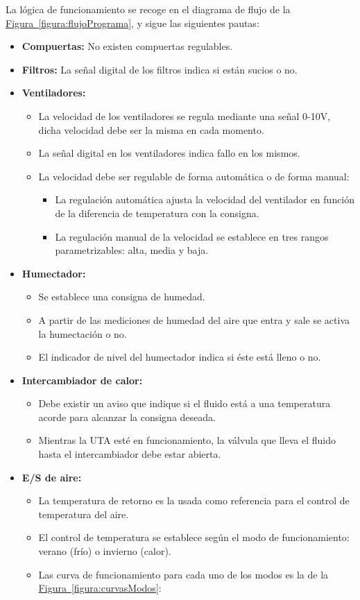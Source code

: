 La lógica de funcionamiento se recoge en el diagrama de flujo de la \hyperref[figura:flujoPrograma]{Figura~\ref{figura:flujoPrograma}}, y sigue las siguientes pautas:

\begin{itemize}
  \item \textbf{Compuertas:} No existen compuertas regulables.
  \item \textbf{Filtros:} La señal digital de los filtros indica si están sucios o no.
  \item \textbf{Ventiladores:} 
  \begin{itemize}
    \item La velocidad de los ventiladores se regula mediante una señal 0-10V, dicha velocidad debe ser la misma en cada momento.
    \item La señal digital en los ventiladores indica fallo en los mismos.
    \item La velocidad debe ser regulable de forma automática o de forma manual:
    \begin{itemize}
      \item La regulación automática ajusta la velocidad del ventilador en función de la diferencia de temperatura con la consigna.
      \item La regulación manual de la velocidad se establece en tres rangos parametrizables: alta, media y baja.
    \end{itemize}
  \end{itemize} 
  \item \textbf{Humectador:} 
  \begin{itemize}
    \item Se establece una consigna de humedad.
    \item A partir de las mediciones de humedad del aire que entra y sale se activa la humectación o no.
    \item El indicador de nivel del humectador indica si éste está lleno o no.
  \end{itemize}
  \item \textbf{Intercambiador de calor:}
  \begin{itemize}
    \item Debe existir un aviso que indique si el fluido está a una temperatura acorde para alcanzar la consigna deseada.
    \item Mientras la UTA esté en funcionamiento, la válvula que lleva el fluido hasta el intercambiador debe estar abierta.
  \end{itemize}
  \item \textbf{E/S de aire:}
  \begin{itemize}
    \item La temperatura de retorno es la usada como referencia para el control de temperatura del aire.
    \item El control de temperatura se establece según el modo de funcionamiento: verano (frío) o invierno (calor).
    \item Las curva de funcionamiento para cada uno de los modos es la de la \hyperref[figura:curvasModos]{Figura~\ref{figura:curvasModos}}:
  \end{itemize}
\end{itemize}

